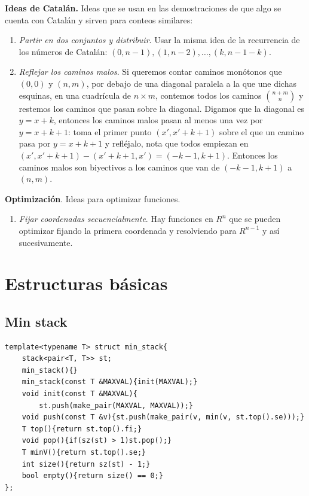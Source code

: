 \documentclass[10pt,spanish,mexico]{article}
\numberwithin{equation}{section}
\begin{document}
\begin{multicols}{2}
\textbf{Ideas de Catalán.} Ideas que se usan en las demostraciones de que algo se cuenta con Catalán y sirven para conteos similares:
\begin{enumerate}[1.]
    \item \textit{Partir en dos conjuntos y distribuir}. Usar la misma idea de la recurrencia de los números de Catalán: $(0, n - 1), (1, n - 2), \dots, (k, n - 1 - k)$.
    \item \textit{Reflejar los caminos malos}. Si queremos contar caminos monótonos que $(0, 0)$ y $(n, m)$, por debajo de una diagonal paralela a la que une dichas esquinas, en una cuadrícula de $n \times m$, contemos todos los caminos $\binom{n + m}{n}$ y restemos los caminos que pasan sobre la diagonal. Digamos que la diagonal es $y = x + k$, entonces los caminos malos pasan al menos una vez por $y = x + k + 1$: toma el primer punto $(x', x' + k + 1)$ sobre el que un camino pasa por $y = x + k + 1$ y refléjalo, nota que todos empiezan en $(x', x' + k + 1) - (x' + k + 1, x') = (- k - 1, k + 1)$. Entonces los caminos malos son biyectivos a los caminos que van de $(- k - 1, k + 1)$ a $(n, m)$.
\end{enumerate}

\textbf{Optimización}. Ideas para optimizar funciones.
\begin{enumerate}[1.]
    \item \textit{Fijar coordenadas secuencialmente}. Hay funciones en $R^n$ que se pueden optimizar fijando la primera coordenada y resolviendo para $R^{n - 1}$ y así sucesivamente.
\end{enumerate}

\hrulefill
\section{Estructuras básicas}
\subsection{Min stack}
\begin{verbatim}
template<typename T> struct min_stack{
    stack<pair<T, T>> st;
    min_stack(){}
    min_stack(const T &MAXVAL){init(MAXVAL);}
    void init(const T &MAXVAL){
        st.push(make_pair(MAXVAL, MAXVAL));}
    void push(const T &v){st.push(make_pair(v, min(v, st.top().se)));}
    T top(){return st.top().fi;}
    void pop(){if(sz(st) > 1)st.pop();}
    T minV(){return st.top().se;}
    int size(){return sz(st) - 1;}
    bool empty(){return size() == 0;}
};
\end{verbatim}


\end{multicols}
\end{document}
